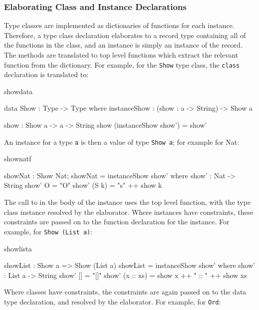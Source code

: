 \subsubsection{Elaborating Class and Instance Declarations}

Type classes are implemented as dictionaries of functions for each instance. Therefore,
a type class declaration elaborates to a record type containing all of the functions
in the class, and an instance is simply an instance of the record. The methods
are translated to top level functions which extract the relevant function from the 
dictionary.  
For example, for the \texttt{Show} type class, the \texttt{class}
declaration is translated to:

\begin{SaveVerbatim}{showdata}

data Show : Type -> Type where
    instanceShow : (show : a -> String) -> Show a

show : Show a -> a -> String
show (instanceShow show') = show'

\end{SaveVerbatim}

\noindent
An instance for a type \texttt{a} is then a value of type \texttt{Show a}; for example for Nat:

\begin{SaveVerbatim}{shownatf}

showNat : Show Nat;
showNat = instanceShow show' where
    show' : Nat -> String
    show' O = "O"
    show' (S k) = "s" ++ show k

\end{SaveVerbatim}

The call to  in the body of the instance uses the top level 
function, with the type class instance resolved by the elaborator.
Where instances have constraints, these constraints are passed on to
the function declaration for the instance. For example, for \texttt{Show (List a)}:

\begin{SaveVerbatim}{showlista}

showList : Show a => Show (List a)
showList = instanceShow show' where
    show' : List a -> String
    show' []        = "[]"
    show' (x :: xs) = show x ++ " :: " ++ show xs

\end{SaveVerbatim}

\noindent
Where classes have constraints, the
constraints are again passed on to the data type declaration, and resolved by the
elaborator. For example, for \texttt{Ord}:

